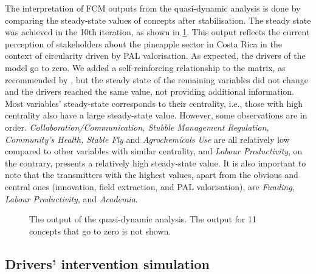 The interpretation of FCM outputs from the quasi-dynamic analysis is done by comparing the steady-state values of concepts after stabilisation. The steady state was achieved in the 10th iteration, as shown in \cref{outputFCM0}. This output reflects the current perception of stakeholders about the pineapple sector in Costa Rica in the context of circularity driven by PAL valorisation. As expected, the drivers of the model go to zero. We added a self-reinforcing relationship to the matrix, as recommended by \cite{diniz2015mapping}, but the steady state of the remaining variables did not change and the drivers reached the same value, not providing additional information. Most variables' steady-state corresponds to their centrality, i.e., those with high centrality also have a large steady-state value. However, some observations are in order. \textit{Collaboration/Communication, Stubble Management Regulation, Community's Health, Stable Fly} and \textit{Agrochemicals Use} are all relatively low compared to other variables with similar centrality, and \textit{Labour Productivity}, on the contrary, presents a relatively high steady-state value. It is also important to note that the transmitters with the highest values, apart from the obvious and central ones (innovation, field extraction, and PAL valorisation), are \textit{Funding}, \textit{Labour Productivity}, and \textit{Academia}. 


\begin{figure}[H]
\caption[Output of the quasi-dynamic analysis]{The output of the quasi-dynamic analysis. The output for 11 concepts that go to zero is not shown.}  
\label{outputFCM0}
\centering

\end{figure}


\subsection{Drivers' intervention simulation}

